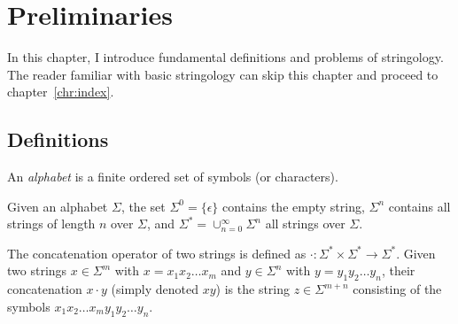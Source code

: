 
\chapter{Preliminaries}

In this chapter, I introduce fundamental definitions and problems of stringology.
The reader familiar with basic stringology can skip this chapter and proceed to chapter~\ref{chr:index}.

\section{Definitions}


\begin{definition}
\label{def:alpha}
An \emph{alphabet} is a finite ordered set of symbols (or characters).
\end{definition}


\begin{definition}
Given an alphabet $\Sigma$, the set $\Sigma^0=\{ \epsilon \}$ contains the empty string, $\Sigma^n$ contains all strings of length $n$ over $\Sigma$, and $\Sigma^* = \cup_{n=0}^{\infty}{\Sigma^n}$ all strings over $\Sigma$.
\end{definition}

\begin{definition}
The concatenation operator of two strings is defined as $\cdot : \Sigma^* \times \Sigma^* \rightarrow \Sigma^*$.
Given two strings $x \in \Sigma^m$ with $x=x_1 x_2 \dots x_m$ and $y \in \Sigma^n$ with $y=y_1 y_2 \dots y_n$, their concatenation $x \cdot y$ (simply denoted $xy$) is the string $z \in \Sigma^{m+n}$ consisting of the symbols $x_1 x_2 \dots x_m y_1 y_2 \dots y_n$.
\end{definition}


